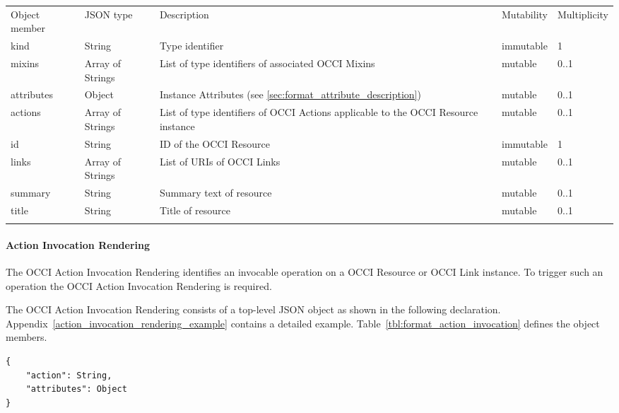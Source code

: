 \documentclass[10pt,a4paper]{article}
\begin{document}
 {
    \begin{tabularx}{\textwidth}{llXll}
    \toprule
    Object member & JSON type & Description & Mutability & Multiplicity \\
    \colrule
    kind & String & Type identifier & immutable & 1 \\

    mixins & Array of Strings & List of type identifiers of associated OCCI
Mixins  &
mutable & 0..1 \\

    attributes & Object & Instance Attributes (see
\ref{sec:format_attribute_description}) & mutable & 0..1 \\

    actions & Array of Strings & List of type identifiers of OCCI
Actions applicable to the OCCI Resource instance & mutable & 0..1 \\

    id & String & ID of the OCCI Resource & immutable & 1\\

    links & Array of Strings & List of URIs of OCCI Links & mutable & 0..1\\
    summary & String & Summary text of resource & mutable & 0..1 \\
    title & String & Title of resource & mutable & 0..1 \\
    \botrule
    \end{tabularx}
}

\paragraph{Action Invocation Rendering}
\label{sec:format_action_invocation}

The OCCI Action Invocation Rendering identifies an invocable operation on a OCCI Resource or
OCCI Link instance. To trigger such an operation the OCCI Action Invocation
Rendering is required.

The OCCI Action Invocation Rendering consists of a top-level JSON object as shown in the
following declaration. Appendix~\ref{action_invocation_rendering_example} contains a detailed example.
Table~\ref{tbl:format_action_invocation} defines the object members.

\begin{lstlisting}
{
    "action": String,
    "attributes": Object
}
\end{lstlisting}
\end{document}
